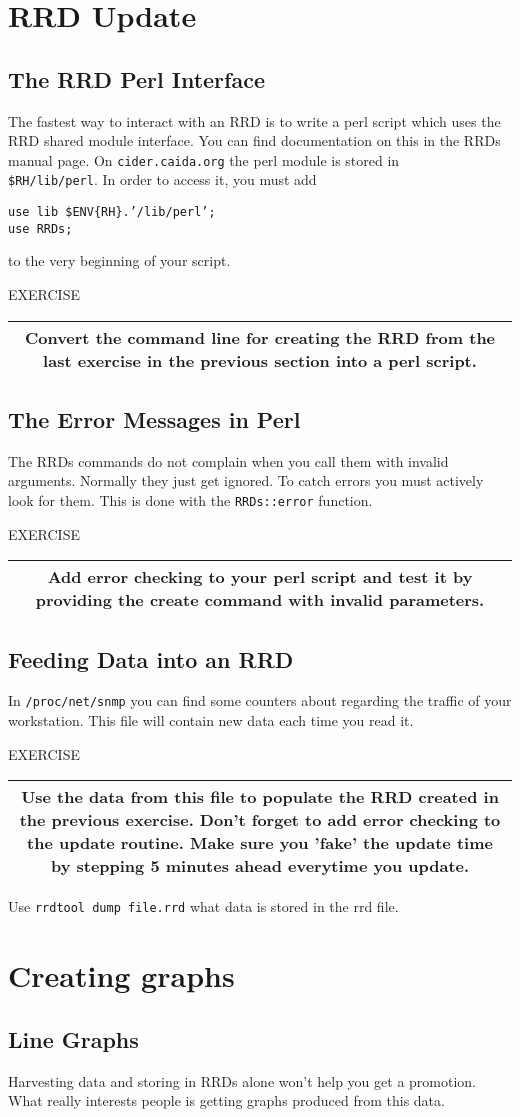 \documentclass[a4paper,12pt]{article}
\newenvironment{work}{\textsf{\tiny EXERCISE}\nopagebreak\\[0.3ex]\begin{tabular}{|c|}
 \hline
 \begin{minipage}{0.965\linewidth}%
 \setlength{\parskip}{1.6ex plus 0.6ex minus 0.4ex}%
 \rule{0pt}{2.8ex}\ignorespaces}
{\rule[-1.8ex]{0pt}{0pt}\end{minipage}\\
 \hline
 \end{tabular}}
\newcommand{\ex}[1]{\subsection{#1}}
\newcommand{\cmd}[1]{\texttt{\mbox{#1}}}
\begin{document}
\newpage
\section{RRD Update}
\ex{The RRD Perl Interface}

The fastest way to interact with an RRD is to write a perl script
which uses the RRD shared module interface. You can find documentation
on this in the RRDs manual page. On \cmd{cider.caida.org} the perl module is
stored in\\ \cmd{\$RH/lib/perl}. In order to access it, you must
add 

\cmd{use lib \$ENV\{RH\}.'/lib/perl';}\\
\cmd{use RRDs;}

to the very beginning of your script.

\begin{work}
Convert the command line for creating the RRD from the last exercise
in the previous section into a perl script.
\end{work}

\ex{The Error Messages in Perl}
The RRDs commands do not complain when you call them with invalid
arguments. Normally they just get ignored. To catch errors you must
actively look for them. This is done with the \cmd{RRDs::error}
function.

\begin{work}
Add error checking to your perl script and test it by providing the
create command with invalid parameters.
\end{work}

\newpage
\ex{Feeding Data into an RRD}
In \cmd{/proc/net/snmp} you can find some counters about regarding the
traffic of your workstation. This file will contain new data each time you read it.

\begin{work}
  Use the data from this file to populate the RRD created in the previous
  exercise. Don't forget to add error checking to the update routine. Make
  sure you 'fake' the update time by stepping 5 minutes ahead everytime you
  update.
\end{work}

Use \cmd{rrdtool dump file.rrd} what data is stored in the rrd file.
\section{Creating graphs}

\ex{Line Graphs}
Harvesting data and storing in RRDs alone won't help you get a
promotion. What really interests people is getting graphs produced from
this data.
\end{document}

